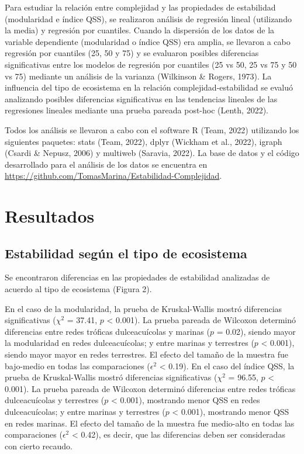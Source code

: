 \documentclass[
]{article}
\begin{document}
Para estudiar la relación entre complejidad y las propiedades de
estabilidad (modularidad e índice QSS), se realizaron análisis de
regresión lineal (utilizando la media) y regresión por cuantiles. Cuando
la dispersión de los datos de la variable dependiente (modularidad o
índice QSS) era amplia, se llevaron a cabo regresión por cuantiles (25,
50 y 75) y se evaluaron posibles diferencias significativas entre los
modelos de regresión por cuantiles (25 vs 50, 25 vs 75 y 50 vs 75)
mediante un análisis de la varianza (Wilkinson \& Rogers, 1973). La
influencia del tipo de ecosistema en la relación complejidad-estabilidad
se evaluó analizando posibles diferencias significativas en las
tendencias lineales de las regresiones lineales mediante una prueba
pareada post-hoc (Lenth, 2022).

Todos los análisis se llevaron a cabo con el software R (Team, 2022)
utilizando los siguientes paquetes: stats (Team, 2022), dplyr (Wickham
et al., 2022), igraph (Csardi \& Nepusz, 2006) y multiweb (Saravia,
2022). La base de datos y el código desarrollado para el análisis de los
datos se encuentra en
\url{https://github.com/TomasMarina/Estabilidad-Complejidad}.

\hypertarget{resultados}{%
\section{Resultados}\label{resultados}}

\hypertarget{estabilidad-seguxfan-el-tipo-de-ecosistema}{%
\subsection{Estabilidad según el tipo de
ecosistema}\label{estabilidad-seguxfan-el-tipo-de-ecosistema}}

Se encontraron diferencias en las propiedades de estabilidad analizadas
de acuerdo al tipo de ecosistema (Figura 2).

En el caso de la modularidad, la prueba de Kruskal-Wallis mostró
diferencias significativas (\({\chi}^2\) = 37.41, \(p\) \textless{}
0.001). La prueba pareada de Wilcoxon determinó diferencias entre redes
tróficas dulceacuícolas y marinas (\(p\) = 0.02), siendo mayor la
modularidad en redes dulceacuícolas; y entre marinas y terrestres (\(p\)
\textless{} 0.001), siendo mayor mayor en redes terrestres. El efecto
del tamaño de la muestra fue bajo-medio en todas las comparaciones
(\({\epsilon}^2\) \textless{} 0.19). En el caso del índice QSS, la
prueba de Kruskal-Wallis mostró diferencias significativas (\({\chi}^2\)
= 96.55, \(p\) \textless{} 0.001). La prueba pareada de Wilcoxon
determinó diferencias entre redes tróficas dulceacuícolas y terrestres
(\(p\) \textless{} 0.001), mostrando menor QSS en redes dulceacuícolas;
y entre marinas y terrestres (\(p\) \textless{} 0.001), mostrando menor
QSS en redes marinas. El efecto del tamaño de la muestra fue medio-alto
en todas las comparaciones (\({\epsilon}^2\) \textless{} 0.42), es
decir, que las diferencias deben ser consideradas con cierto recaudo.
\end{document}

